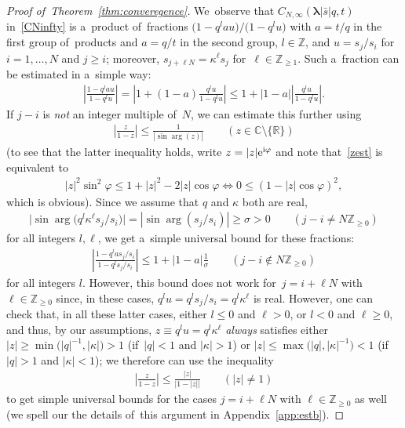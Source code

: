 \documentclass[pdftex]{sigma}%
\numberwithin{equation}{section}
\newcommand{\vlam}{\boldsymbol{\lambda}}
\newcommand{\bs}{\bar{s}}
\newcommand{\ee}{{\rm e}}
\newcommand{\ii}{{\rm i}}
\newcommand{\R}{{\mathbb R}}
\newcommand{\C}{{\mathbb C}}
\newcommand{\Z}{{\mathbb Z}}
\begin{document}
\begin{proof}[Proof of~Theorem~\ref{thm:converegence}]
We~observe that $C_{N,\infty}(\vlam|\bs|q,t)$ in~\eqref{CNinfty} is a~product of~fractions $\big(1-q^{l}au\big)/\big(1-q^l u\big)$ with $a=t/q$ in the first group of~products and $a=q/t$ in the second group,
 $l\in\Z$, and $u=s_j/s_i$ for~$i=1,\dots,N$ and $j\geq i$; moreover, $s_{j+\ell N}=\kappa^\ell s_j$ for~$\ell\in\Z_{\geq 1}$.
Such a~fraction can be estimated in a~simple way:
\begin{gather*}
\left|\frac{1-q^{l}au}{1-q^l u}\right| = \left|1+(1-a)\frac{q^l u}{1-q^l u} \right|\leq 1+|1-a|\left|\frac{q^l u}{1-q^l u}\right|\!.
\end{gather*}
If $j-i$ is {\em not} an integer multiple of~$N$, we can estimate this further using
\begin{gather}
\label{zest}
\left| \frac{z}{1-z}\right| \leq \frac1{|\sin\arg(z)|} \qquad (z\in\C\setminus\{\R\})
\end{gather}
(to see that the latter inequality holds, write $z=|z|\ee^{\ii\varphi}$ and note that~\eqref{zest} is equivalent to
\begin{gather*}
|z|^2\sin^2\varphi \leq 1+|z|^2-2|z|\cos\varphi\Leftrightarrow 0\leq (1-|z|\cos\varphi)^2,
\end{gather*}
which is obvious). Since we assume that $q$ and $\kappa$ both are real,
\begin{gather*}
\big|\sin\arg\big(q^l \kappa^{\ell }s_j/s_i\big)\big| = |\sin\arg(s_j/s_i)| \geq \sigma>0\qquad (j-i\neq N\Z_{\geq 0})
\end{gather*}
for all integers $l,\ell$, we get a~simple universal bound for these fractions:
\begin{gather*}
\left|\frac{1-q^l a s_j/s_i}{1-q^l s_j/s_i}\right| \leq 1+|1-a|\frac{1}{\sigma} \qquad (j-i \notin N\Z_{\geq 0})
\end{gather*}
for all integers $l$. However, this bound does not work for~$j=i+\ell N$ with $\ell\in\Z_{\geq 0}$ since, in these cases, $q^l u=q^l s_j/s_i=q^l \kappa^\ell$ is real.
However, one can check that, in all these latter cases, either $l\leq 0$ and $\ell>0$, or $l<0$ and $\ell\geq 0$, and thus, by our assumptions, $z\equiv q^lu=q^l \kappa^\ell$ {\em always}
satisfies either $|z|\geq \min\big(|q|^{-1},|\kappa|\big)>1$ (if~$|q|<1$ and $|\kappa|>1$) or $|z|\leq \max\big(|q|,|\kappa|^{-1}\big)<1$ (if~$|q|>1$ and $|\kappa|<1$); we therefore can use the inequality
\begin{gather*}
\left| \frac{z}{1-z}\right| \leq \frac{|z|}{|1-|z||} \qquad (|z|\neq 1)
\end{gather*}
to get simple universal bounds for the cases $j=i+\ell N$ with $\ell\in\Z_{\geq 0}$ as well (we spell our the details of~this argument in Appendix~\ref{app:estb}).

\end{proof}
\end{document}

